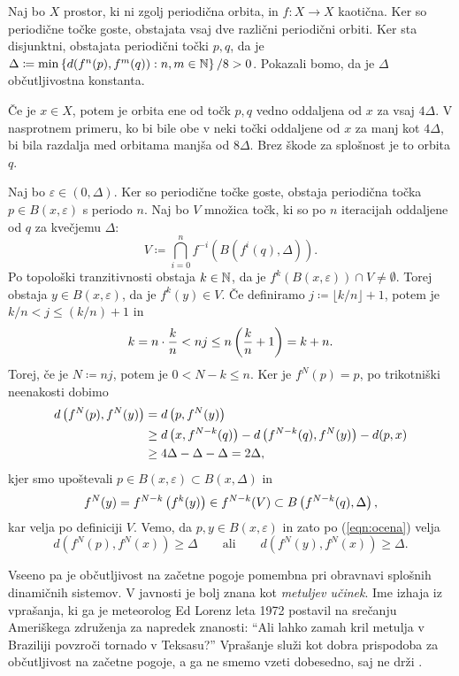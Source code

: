 \begin{dokaz}
    Naj bo \(X\) prostor, ki ni zgolj periodična orbita, in \(f \colon X \to X\) kaotična. Ker so periodične točke goste, obstajata vsaj dve različni periodični orbiti. Ker sta disjunktni, obstajata periodični točki \(p, q\), da je \(\Delta \coloneq \min \left\{ d (f^n (p), f^m (q)) : n, m \in \mathbb N \right\} / 8 > 0\). Pokazali bomo, da je \(\Delta\) občutljivostna konstanta.

    Če je \(x \in X\), potem je orbita ene od točk \(p, q\) vedno oddaljena od \(x\) za vsaj \(4 \Delta\). V nasprotnem primeru, ko bi bile obe v neki točki oddaljene od \(x\) za manj kot \(4 \Delta\), bi bila razdalja med orbitama manjša od \(8 \Delta\). Brez škode za splošnost je to orbita \(q\).

    Naj bo \(\varepsilon \in (0, \Delta)\). Ker so periodične točke goste, obstaja periodična točka \(p \in B (x, \varepsilon)\) s periodo \(n\). Naj bo \(V\) množica točk, ki so po \(n\) iteracijah oddaljene od \(q\) za kvečjemu \(\Delta\):
    \[V \coloneq \bigcap_{i = 0}^n f^{- i} (B (f^i (q), \Delta)).\]
    Po topološki tranzitivnosti obstaja \(k \in \mathbb N\), da je \(f^k (B (x, \varepsilon)) \cap V \neq \emptyset\). Torej obstaja \(y \in B (x, \varepsilon)\), da je \(f^k (y) \in V\). Če definiramo \(j \coloneq \lfloor k / n \rfloor + 1\), potem je \(k / n < j \leq (k / n) + 1\) in
    \[k = n \cdot \frac{k}{n} < n j \leq n \left( \frac{k}{n} + 1 \right) = k + n.\]
    Torej, če je \(N \coloneq n j\), potem je \(0 < N - k \leq n\). Ker je \(f^N (p) = p\), po trikotniški neenakosti dobimo
    \begin{align}
        d \left( f^N (p), f^N (y) \right) &= d \left( p, f^N (y) \right) \nonumber\\
        &\geq d \left( x, f^{N - k} (q) \right) - d \left( f^{N - k} (q), f^N (y) \right) - d (p, x) \label{eqn:ocena}\\
        &\geq 4 \Delta - \Delta - \Delta = 2 \Delta, \nonumber
    \end{align}
    kjer smo upoštevali \(p \in B (x, \varepsilon) \subset B (x, \Delta)\) in
    \[f^N (y) = f^{N - k} \left( f^k (y) \right) \in f^{N - k} (V) \subset B \left( f^{N - k} (q), \Delta \right),\]
    kar velja po definiciji \(V\). Vemo, da \(p, y \in B (x, \varepsilon)\) in zato po (\ref{eqn:ocena}) velja
    \[d (f^N (p), f^N (x)) \geq \Delta \qquad \text{ali} \qquad d (f^N (y), f^N (x)) \geq \Delta.\]
\end{dokaz}

\noindent Vseeno pa je občutljivost na začetne pogoje pomembna pri obravnavi splošnih dinamičnih sistemov. V javnosti je bolj znana kot \emph{metuljev učinek}. Ime izhaja iz vprašanja, ki ga je meteorolog Ed Lorenz leta \num{1972} postavil na srečanju Ameriškega združenja za napredek znanosti: ``Ali lahko zamah kril metulja v Braziliji povzroči tornado v Teksasu?'' Vprašanje služi kot dobra prispodoba za občutljivost na začetne pogoje, a ga ne smemo vzeti dobesedno, saj ne drži \cite{Pielke_2024}.

